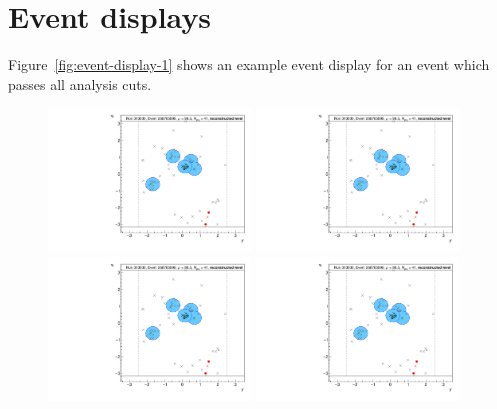 \section{Event displays}
\label{app:event-displays}
Figure~\ref{fig:event-display-1} shows an example event display for an event which passes all analysis cuts.

\begin{figure}[h!]
  \centering
  \includegraphics[page=26,width=0.48\textwidth]{figures/EventDisplays.pdf}
  \includegraphics[page=27,width=0.48\textwidth]{figures/EventDisplays.pdf} \\
  \includegraphics[page=29,width=0.48\textwidth]{figures/EventDisplays.pdf}
  \includegraphics[page=30,width=0.48\textwidth]{figures/EventDisplays.pdf}

\end{figure}
